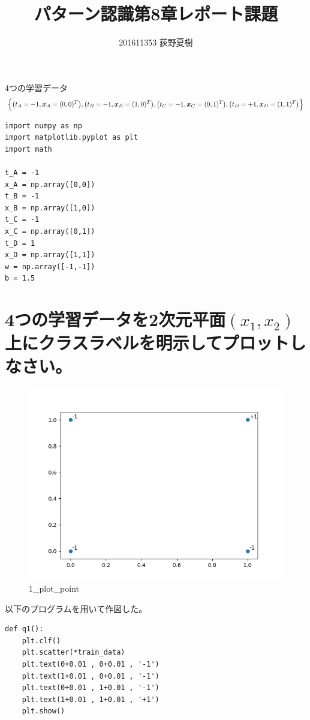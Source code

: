 \documentclass{ltjsarticle}
\title{パターン認識第8章レポート課題}
\author{201611353 荻野夏樹}
\begin{document}
\maketitle
4つの学習データ
\begin{align*}
	\Bigl\{
		\bigl(t_A=-1,\bm{x}_A=(0,0)^T\bigr),
		\bigl(t_B=-1,\bm{x}_B=(1,0)^T\bigr),
		\bigl(t_C=-1,\bm{x}_C=(0,1)^T\bigr),
		\bigl(t_D=+1,\bm{x}_D=(1,1)^T\bigr)
	\Bigr\}
\end{align*}

\begin{lstlisting}[caption=以降のPythonプログラムが参照する共通の定義部分]
import numpy as np
import matplotlib.pyplot as plt
import math

t_A = -1
x_A = np.array([0,0])
t_B = -1
x_B = np.array([1,0])
t_C = -1
x_C = np.array([0,1])
t_D = 1
x_D = np.array([1,1])
w = np.array([-1,-1])
b = 1.5
\end{lstlisting}

\section{4つの学習データを2次元平面$(x_1 , x_2)$上にクラスラベルを明示してプロットしなさい。}
\begin{figure}[H]
	\centering
	\includegraphics[width=0.5\linewidth]{../images/1_plot_point.png}
	\caption{1\_plot\_point}
	\label{1_plot_point}
\end{figure}
以下のプログラムを用いて作図した。
\begin{lstlisting}
def q1():
    plt.clf()
    plt.scatter(*train_data)
    plt.text(0+0.01 , 0+0.01 , '-1')
    plt.text(1+0.01 , 0+0.01 , '-1')
    plt.text(0+0.01 , 1+0.01 , '-1')
    plt.text(1+0.01 , 1+0.01 , '+1')
    plt.show()
\end{lstlisting}
\end{document}
